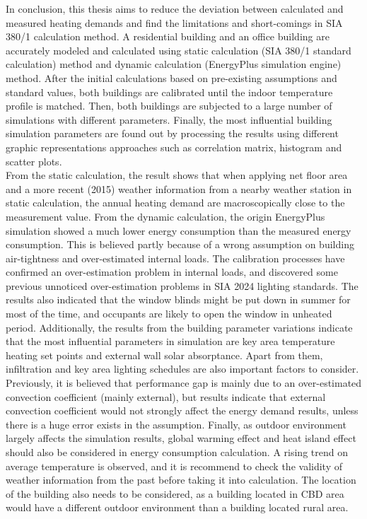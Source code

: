 \documentclass[a4paper, oneside]{discothesis}
\begin{document}
    In conclusion, this thesis aims to reduce the deviation between calculated and measured heating demands and find the limitations and short-comings in SIA 380/1 calculation method. A residential building and an office building are accurately modeled and calculated using static calculation (SIA 380/1 standard calculation) method and dynamic calculation (EnergyPlus simulation engine) method. After the initial calculations based on pre-existing assumptions and standard values, both buildings are calibrated until the indoor temperature profile is matched. Then, both buildings are subjected to a large number of simulations with different parameters. Finally, the most influential building simulation parameters are found out by processing the results using different graphic representations approaches such as correlation matrix, histogram and scatter plots. \\

    From the static calculation, the result shows that when applying net floor area and a more recent (2015) weather information from a nearby weather station in static calculation, the annual heating demand are macroscopically close to the measurement value. From the dynamic calculation, the origin EnergyPlus simulation showed a much lower energy consumption than the measured energy consumption. This is believed partly because of a wrong assumption on building air-tightness and over-estimated internal loads. The calibration processes have confirmed an over-estimation problem in internal loads, and discovered some previous unnoticed over-estimation problems in SIA 2024 lighting standards. The results also indicated that the window blinds might be put down in summer for most of the time, and occupants are likely to open the window in unheated period. Additionally, the results from the building parameter variations indicate that the most influential parameters in simulation are key area temperature heating set points and external wall solar absorptance. Apart from them, infiltration and key area lighting schedules are also important factors to consider. Previously, it is believed that performance gap is mainly due to an over-estimated convection coefficient (mainly external), but results indicate that external convection coefficient would not strongly affect the energy demand results, unless there is a huge error exists in the assumption. Finally, as outdoor environment largely affects the simulation results, global warming effect and heat island effect should also be considered in energy consumption calculation. A rising trend on average temperature is observed, and it is recommend to check the validity of weather information from the past before taking it into calculation. The location of the building also needs to be considered, as a building located in CBD area would have a different outdoor environment than a building located rural area.\\
\end{document}
